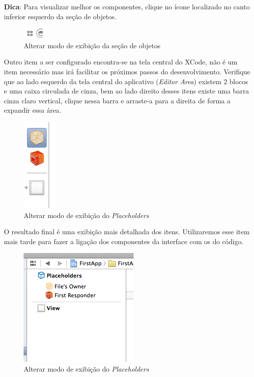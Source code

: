 \documentclass[a4paper,12pt,brazil,doubleside]{book}
\begin{document}
\begin{singlespace}
\begin{framed}

\textbf{Dica}: Para visualizar melhor os componentes, clique no ícone localizado no canto inferior esquerdo da seção de objetos.
\end{framed}

\begin{figure}[H]
  \centering
  \includegraphics[scale=1]{figuras/3/tela_novo_projeto_13.png}
  \caption{Alterar modo de exibição da seção de objetos}
  \label{fig:a}
\end{figure}


Outro item a ser configurado encontra-se na tela central do XCode, não é um item necessário mas irá facilitar os próximos passos do desenvolvimento. Verifique que ao lado esquerdo da tela central do aplicativo (\emph{Editor Area}) existem 2 blocos e uma caixa circulada de cinza, bem ao lado direito desses itens existe uma barra cinza claro vertical, clique nessa barra e arraste-a para a direita de forma a expandir essa área.

\begin{figure}[H]
  \centering
  \includegraphics[scale=1]{figuras/3/tela_novo_projeto_14.png}
  \caption{Alterar modo de exibição do \emph{Placeholders}}
  \label{fig:a}
\end{figure}


O resultado final é uma exibição mais detalhada dos itens. Utilizaremos esse item mais tarde para fazer a ligação dos componentes da interface com os do código.

\begin{figure}[H]
  \centering
  \includegraphics[scale=1]{figuras/3/tela_novo_projeto_15.png}
  \caption{Alterar modo de exibição do \emph{Placeholders}}
  \label{fig:a}
\end{figure}




\end{singlespace}
\end{document}
